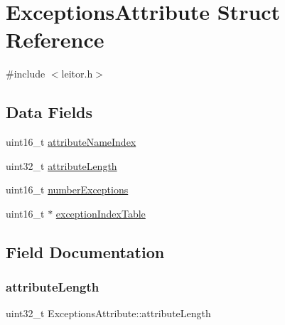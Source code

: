 \hypertarget{structExceptionsAttribute}{}\section{Exceptions\+Attribute Struct Reference}
\label{structExceptionsAttribute}


{\ttfamily \#include $<$leitor.\+h$>$}

\subsection*{Data Fields}
\begin{DoxyCompactItemize}
\item 
uint16\+\_\+t \hyperlink{structExceptionsAttribute_a18fa6a96d9f0c1a55230e688d72b2a4c}{attribute\+Name\+Index}
\item 
uint32\+\_\+t \hyperlink{structExceptionsAttribute_ab2bca3da1eb560c5c08449106ff85c54}{attribute\+Length}
\item 
uint16\+\_\+t \hyperlink{structExceptionsAttribute_ae877887aa7835d6a65b2a9dcf313e849}{number\+Exceptions}
\item 
uint16\+\_\+t $\ast$ \hyperlink{structExceptionsAttribute_a6e7edf18fe9cf9f9cae4e4aed16d0837}{exception\+Index\+Table}
\end{DoxyCompactItemize}


\subsection{Field Documentation}
\mbox{\label{structExceptionsAttribute_ab2bca3da1eb560c5c08449106ff85c54}} 
\subsubsection{\texorpdfstring{attribute\+Length}{attributeLength}}
{\footnotesize\ttfamily uint32\+\_\+t Exceptions\+Attribute\+::attribute\+Length}

\mbox{\label{structExceptionsAttribute_a18fa6a96d9f0c1a55230e688d72b2a4c}} 
